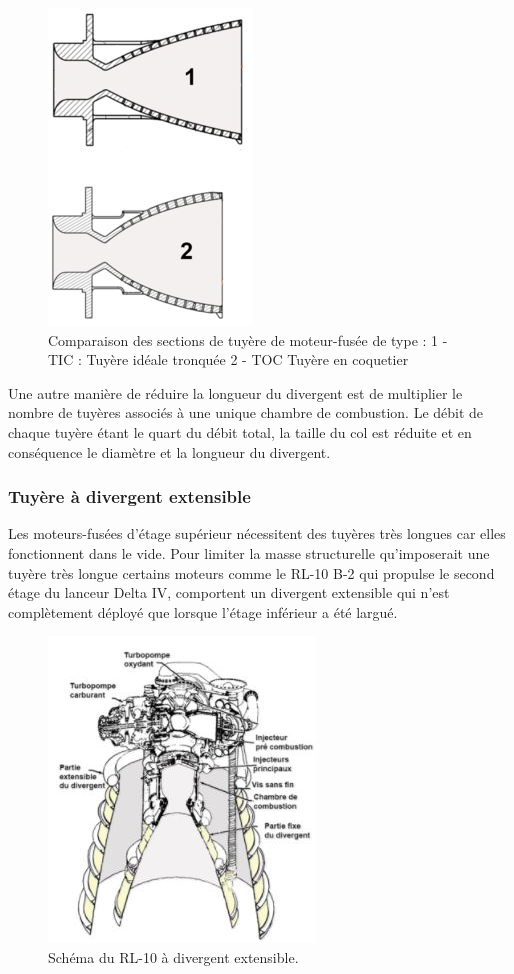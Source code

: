 \documentclass{report}
\begin{document}
\begin{figure}[h!]
    \centering
    \includegraphics[scale=0.6]{48.JPG}
    \caption{Comparaison des sections de tuyère de moteur-fusée de type : 1 - TIC : Tuyère idéale tronquée 2 - TOC Tuyère en coquetier}
    \label{48}
\end{figure}

Une autre manière de réduire la longueur du divergent est de multiplier le nombre de tuyères associés à une unique chambre de combustion. Le débit de chaque tuyère étant le quart du débit total, la taille du col est réduite et en conséquence le diamètre et la longueur du divergent.

\subsubsection{Tuyère à divergent extensible}

Les moteurs-fusées d'étage supérieur nécessitent des tuyères très longues car elles fonctionnent dans le vide. Pour limiter la masse structurelle qu'imposerait une tuyère très longue certains moteurs comme le RL-10 B-2 qui propulse le second étage du lanceur Delta IV, comportent un divergent extensible qui n'est complètement déployé que lorsque l'étage inférieur a été largué.

\begin{figure}[h!]
    \centering
    \includegraphics[scale=0.8]{49.JPG}
    \caption{Schéma du RL-10 à divergent extensible.}
    \label{49}
\end{figure}
\end{document}
